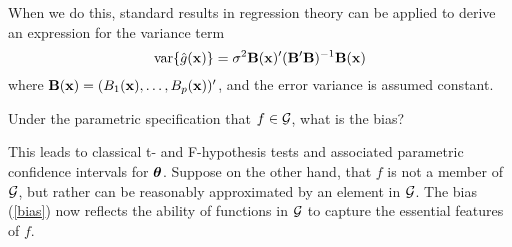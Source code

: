 When we do this, standard results in regression theory can be applied
to derive an expression for the variance term
\[
\mbox{var}\{\hat{g}({\mathbf x})\} = \sigma^2 {\mathbf B}({\mathbf x})'({\mathbf B}'{\mathbf B})^{-1}{\mathbf B}({\mathbf x})
\]
where ${\mathbf B}({\mathbf x}) = (B_1({\mathbf x}),\dots,B_p({\mathbf x}))'$, and the error variance is
assumed constant.

Under the parametric specification that  
$f \in \cal G$, what is the bias? 

 This leads to
classical t- and F-hypothesis tests and associated parametric
confidence intervals for $\mbox{\boldmath $\theta$\unboldmath}$. Suppose on the other hand,
that $f$ is not a member of $\cal G$, but rather can be reasonably
approximated by an element in $\cal G$. The bias (\ref{bias}) now reflects
the ability of functions in $\cal G$ to capture the essential features
of $f$.


